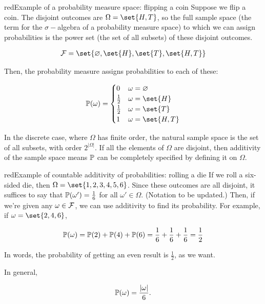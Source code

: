 \documentclass[./analysis.tex]{subfiles}
\begin{document}
    \begin{mycolorbox}{red}{Example of a probability measure space: flipping a coin}
    Suppose we flip a coin. The disjoint outcomes are $\Omega = \set{H, T}$, so the full sample space (the term for the $\sigma-$algebra of a probability measure space) to which we can assign probabilities is the power set (the set of all subsets) of these disjoint outcomes.

    \begin{align*}
        \F = \set{\varnothing, \set{H}, \set{T}, \set{H, T}}
    \end{align*}

    Then, the probability measure assigns probabilities to each of these:

    \begin{align*}
        \P(\omega) = \begin{cases} 0 & \omega = \varnothing \\ \frac{1}{2} & \omega = \set{H} \\ \frac{1}{2} & \omega = \set{T} \\ 1 & \omega = \set{H, T} \end{cases}
    \end{align*}
    \end{mycolorbox}

    In the discrete case, where $\Omega$ has finite order, the natural sample space is the set of all subsets, with order $2^{|\Omega|}$. If all the elements of $\Omega$ are disjoint, then additivity of the sample space means $\P$ can be completely specified by defining it on $\Omega$.

    \begin{mycolorbox}{red}{Example of countable additivity of probabilities: rolling a die}
        If we roll a six-sided die, then $\Omega = \set{1, 2, 3, 4, 5, 6}$. Since these outcomes are all disjoint, it suffices to say that $\P(\omega') = \frac{1}{6}$ for all $\omega' \in \Omega$. (Notation to be updated.) Then, if we're given any $\omega \in \F$, we can use additivity to find its probability. For example, if $\omega = \set{2, 4, 6}$, 

        \begin{align*}
            \P(\omega) = \P(2) + \P(4) + \P(6) = \frac{1}{6} + \frac{1}{6} + \frac{1}{6} = \frac{1}{2}
        \end{align*}

        In words, the probability of getting an even result is $\frac{1}{2}$, as we want. 

        In general, 

        \begin{align*}
            \P(\omega) = \frac{|\omega|}{6}.
        \end{align*}
    \end{mycolorbox}
\end{document}
